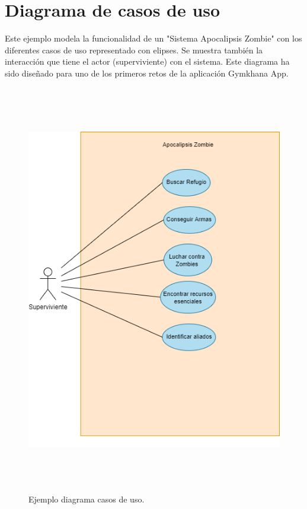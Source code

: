 \documentclass[a4paper, 12pt]{book}
\begin{document}
\section{Diagrama de casos de uso}
Este ejemplo modela la funcionalidad de un "Sistema Apocalipsis Zombie" con los diferentes casos de uso representado con elipses. Se muestra también la interacción que tiene el actor (superviviente) con el sistema. Este diagrama ha sido diseñado para uno de los primeros retos de la aplicación Gymkhana App.
\begin{figure}
	\centering
	\includegraphics[height=18cm,width=12cm, keepaspectratio]{img/diagrama_casos_uso.png}
	\caption{Ejemplo diagrama casos de uso.}\label{fig:diagrama_casos_uso}
\end{figure}
\end{document}
